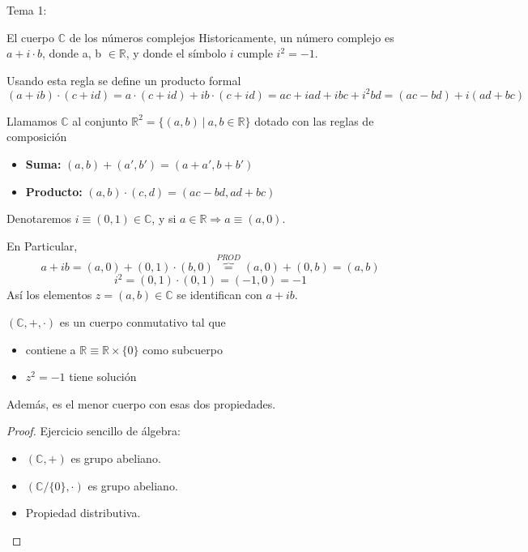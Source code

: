 \documentclass{article}
\newcommand{\C}{\mathbb{C}}
\begin{document}

\begin{section}{Tema 1:}

    \begin{subsection}{El cuerpo $\mathbb{C}$ de los números complejos}
        Historicamente, un número complejo es $a+i\cdot b$, donde a, b $\in \mathbb{R}$, y donde el símbolo $i$
        cumple $i^2 = -1$.

        Usando esta regla se define un producto formal
        \[(a+ib)\cdot(c+id) = a\cdot(c+id) + ib\cdot(c+id)=ac+iad+ibc+i^2bd=(ac-bd)+i(ad+bc)\]

        \begin{definition}
            Llamamos $\mathbb{C}$ al conjunto $\mathbb{R}^2 = \{(a,b)\ |\ a,b\in \mathbb{R}\}$ dotado con las reglas de
            composición 
            \begin{itemize}
                \item \textbf{Suma:} $(a,b) + (a',b') = (a+a', b+b')$
                \item \textbf{Producto:} $(a,b) \cdot (c,d) = (ac-bd, ad+bc)$
            \end{itemize}       
        \end{definition}

        Denotaremos $i\equiv (0,1)\in \mathbb{C}$, y si $a\in \mathbb{R}\Rightarrow a\equiv(a,0)$.

        En Particular, \[a+ib = (a,0) + (0,1)\cdot (b,0) \overbrace{=}^{PROD} (a,0) + (0,b)=(a,b)\]
        \[i^2 = (0,1)\cdot (0,1)=(-1,0) = -1\]
        Así los elementos $z=(a,b)\in \C$ se identifican con $a+ib$.


        \begin{theorem}
            $(\C, +,\cdot)$ es un cuerpo conmutativo tal que
            \begin{itemize}
                \item contiene a $\mathbb{R}\equiv \mathbb{R}\times \{0\}$ como subcuerpo
                \item $z^2=-1$ tiene solución
            \end{itemize}
            Además, es el menor cuerpo con esas dos propiedades.
        \end{theorem}
        \begin{proof}
            Ejercicio sencillo de álgebra:
            \begin{itemize}
                \item $(\C, +)$ es grupo abeliano.
                \item $(\C/\{0\}, \cdot)$ es grupo abeliano.
                \item Propiedad distributiva.
            \end{itemize}


\end{proof}
\end{subsection}
\end{section}
\end{document}
